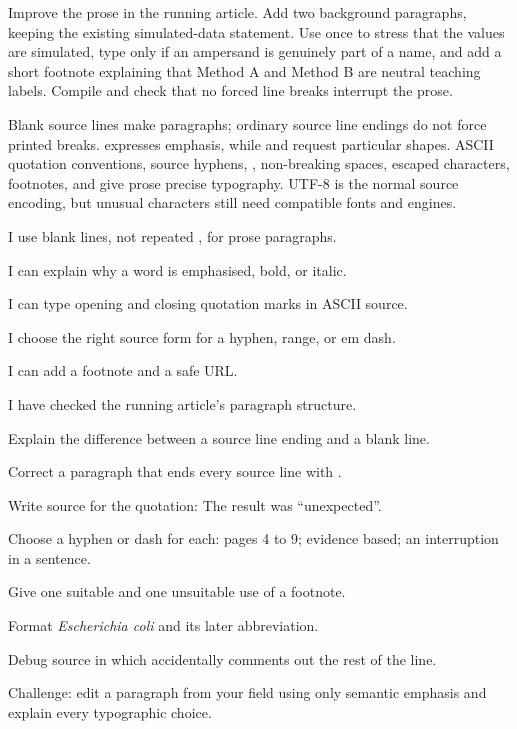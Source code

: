 \chapterproject

\begin{miniproject}
Improve the prose in the running article. Add two background paragraphs,
keeping the existing simulated-data statement. Use  once to stress
that the values are simulated, type  only if an
ampersand is genuinely part of a name, and add a short footnote explaining
that Method A and Method B are neutral teaching labels. Compile and check that
no forced line breaks interrupt the prose.
\end{miniproject}

\chaptersummary

Blank source lines make paragraphs; ordinary source line endings do not force
printed breaks.  expresses emphasis, while  and
 request particular shapes. ASCII quotation conventions, source
hyphens, , non-breaking spaces, escaped characters, footnotes, and
 give prose precise typography. UTF-8 is the normal source encoding,
but unusual characters still need compatible fonts and engines.

\chaptercheck
\begin{chapterchecklist}
  \item I use blank lines, not repeated \code{\\}, for prose paragraphs.
  \item I can explain why a word is emphasised, bold, or italic.
  \item I can type opening and closing quotation marks in ASCII source.
  \item I choose the right source form for a hyphen, range, or em dash.
  \item I can add a footnote and a safe URL.
  \item I have checked the running article's paragraph structure.
\end{chapterchecklist}

\chapterexercisestitle
\begin{chapterexercises}
  \item Explain the difference between a source line ending and a blank line.
  \item Correct a paragraph that ends every source line with \code{\\}.
  \item Write source for the quotation: The result was ``unexpected''.
  \item Choose a hyphen or dash for each: pages 4 to 9; evidence based; an
        interruption in a sentence.
  \item Give one suitable and one unsuitable use of a footnote.
  \item Format \textit{Escherichia coli} and its later abbreviation.
  \item Debug source in which  accidentally comments out the rest
        of the line.
  \item Challenge: edit a paragraph from your field using only semantic
        emphasis and explain every typographic choice.
\end{chapterexercises}
